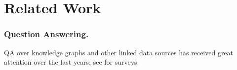 
\section{Related Work}
\label{sec:related-work}


\subsubsection{Question Answering.} 
QA over knowledge graphs and other linked data sources has received great attention over the
last years; see \cite{DBLP:conf/rweb/UngerFC14,DBLP:journals/kais/DiefenbachLSM18} for surveys.

